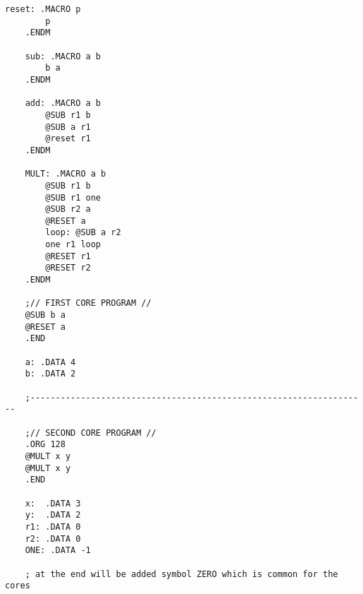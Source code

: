 \documentclass[../main.tex]{subfiles}
\begin{document}
\begin{lstlisting}[caption={Exemplu de cod în subleq assembly}, label={lst:code}]
    reset: .MACRO p
        p
    .ENDM
    
    sub: .MACRO a b
        b a
    .ENDM
    
    add: .MACRO a b
        @SUB r1 b
        @SUB a r1
        @reset r1
    .ENDM
    
    MULT: .MACRO a b
        @SUB r1 b
        @SUB r1 one
        @SUB r2 a
        @RESET a
        loop: @SUB a r2
        one r1 loop
        @RESET r1
        @RESET r2
    .ENDM
    
    ;// FIRST CORE PROGRAM //
    @SUB b a
    @RESET a
    .END
    
    a: .DATA 4
    b: .DATA 2
    
    ;-------------------------------------------------------------------
    
    ;// SECOND CORE PROGRAM //
    .ORG 128
    @MULT x y
    @MULT x y
    .END
    
    x:  .DATA 3
    y:  .DATA 2
    r1: .DATA 0
    r2: .DATA 0
    ONE: .DATA -1
    
    ; at the end will be added symbol ZERO which is common for the cores
    \end{lstlisting}
\end{document}
